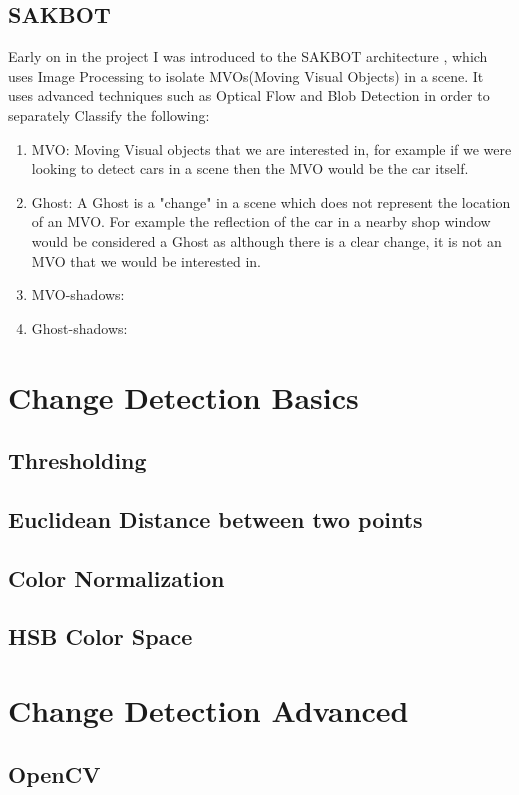 \documentclass[a4paper]{report}
\begin{document}
\section{SAKBOT}
Early on in the project I was introduced to the SAKBOT architecture \cite{SAKBOT}, which uses Image Processing to isolate MVOs(Moving Visual Objects) in a scene. It uses advanced techniques such as Optical Flow and Blob Detection in order to separately Classify the following:
\begin{enumerate}
  \item MVO: Moving Visual objects that we are interested in, for example if we were looking to detect cars in a scene then the MVO would be the car itself.
  \item Ghost: A Ghost is a "change" in a scene which does not represent the location of an MVO. For example the reflection of the car in a nearby shop window would be considered a Ghost as although there is a clear change, it is not an MVO that we would be interested in.
  \item MVO-shadows:
  \item Ghost-shadows:
\end{enumerate}


\chapter{Change Detection Basics}
\section{Thresholding}
\section{Euclidean Distance between two points}
\section{Color Normalization}
\section{HSB Color Space}

\chapter{Change Detection Advanced}
\section{OpenCV}
\end{document}
